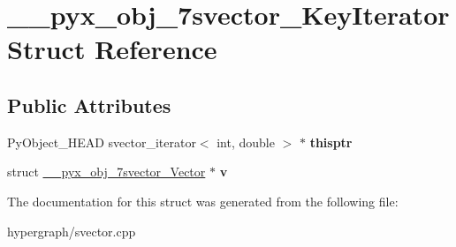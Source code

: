 \hypertarget{struct____pyx__obj__7svector__KeyIterator}{
\section{\_\-\_\-pyx\_\-obj\_\-7svector\_\-KeyIterator Struct Reference}
\label{struct____pyx__obj__7svector__KeyIterator}
}
\subsection*{Public Attributes}
\begin{DoxyCompactItemize}
\item 
\hypertarget{struct____pyx__obj__7svector__KeyIterator_a0036efbf9b6e49dd17535ff48c93191c}{
PyObject\_\-HEAD svector\_\-iterator$<$ int, double $>$ $\ast$ {\bfseries thisptr}}
\label{struct____pyx__obj__7svector__KeyIterator_a0036efbf9b6e49dd17535ff48c93191c}

\item 
\hypertarget{struct____pyx__obj__7svector__KeyIterator_a0d822a8caddd7b8a6de4482f607e61d0}{
struct \hyperlink{struct____pyx__obj__7svector__Vector}{\_\-\_\-pyx\_\-obj\_\-7svector\_\-Vector} $\ast$ {\bfseries v}}
\label{struct____pyx__obj__7svector__KeyIterator_a0d822a8caddd7b8a6de4482f607e61d0}

\end{DoxyCompactItemize}


The documentation for this struct was generated from the following file:\begin{DoxyCompactItemize}
\item 
hypergraph/svector.cpp\end{DoxyCompactItemize}
